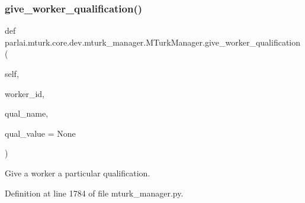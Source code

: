 \subsubsection{\texorpdfstring{give\+\_\+worker\+\_\+qualification()}{give\_worker\_qualification()}}
{\footnotesize\ttfamily def parlai.\+mturk.\+core.\+dev.\+mturk\+\_\+manager.\+M\+Turk\+Manager.\+give\+\_\+worker\+\_\+qualification (\begin{DoxyParamCaption}\item[{}]{self,  }\item[{}]{worker\+\_\+id,  }\item[{}]{qual\+\_\+name,  }\item[{}]{qual\+\_\+value = {\ttfamily None} }\end{DoxyParamCaption})}

\begin{DoxyVerb}Give a worker a particular qualification.
\end{DoxyVerb}
 

Definition at line 1784 of file mturk\+\_\+manager.\+py.


